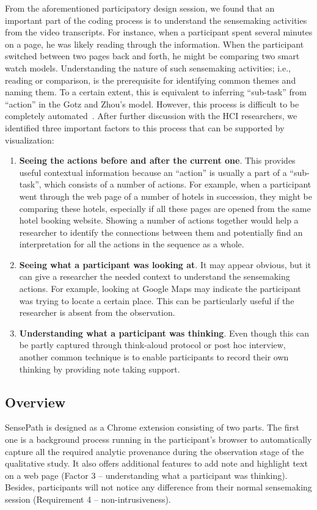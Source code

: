 From the aforementioned participatory design session, we found that an important part of the coding process is to understand the sensemaking activities from the video transcripts. For instance, when a participant spent several minutes on a page, he was likely reading through the information. When the participant switched between two pages back and forth, he might be comparing two smart watch models. Understanding the nature of such sensemaking activities; i.e., reading or comparison, is the prerequisite for identifying common themes and naming them. To a certain extent, this is equivalent to inferring ``sub-task'' from ``action'' in the Gotz and Zhou's model. However, this process is difficult to be completely automated~\cite{Dou2009}. After further discussion with the HCI researchers, we identified three important factors to this process that can be supported by visualization:
\begin{enumerate}
	\item \textbf{Seeing the actions before and after the current one}. This provides useful contextual information because an ``action'' is usually a part of a ``sub-task'', which consists of a number of actions. For example, when a participant went through the web page of a number of hotels in succession, they might be comparing these hotels, especially if all these pages are opened from the same hotel booking website. Showing a number of actions together would help a researcher to identify the connections between them and potentially find an interpretation for all the actions in the sequence as a whole.
	\item \textbf{Seeing what a participant was looking at}. It may appear obvious, but it can give a researcher the needed context to understand the sensemaking actions. For example, looking at Google Maps may indicate the participant was trying to locate a certain place. This can be particularly useful if the researcher is absent from the observation.
	\item \textbf{Understanding what a participant was thinking}. Even though this can be partly captured through think-aloud protocol or post hoc interview, another common technique is to enable participants to record their own thinking by providing note taking support.
\end{enumerate}

\subsection{Overview}
SensePath is designed as a Chrome extension consisting of two parts. The first one is a background process running in the participant's browser to automatically capture all the required analytic provenance during the observation stage of the qualitative study. It also offers additional features to add note and highlight text on a web page (Factor 3 -- understanding what a participant was thinking). Besides, participants will not notice any difference from their normal sensemaking session (Requirement 4 -- non-intrusiveness). 


